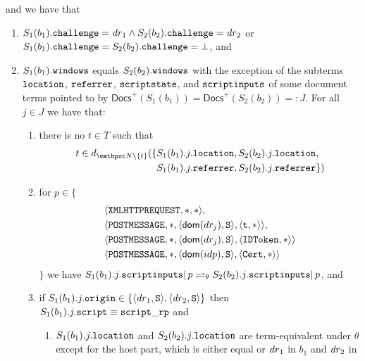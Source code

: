 \begin{theorem}
\begin{definition}
\begin{enumerate}
      and we have that
      \begin{enumerate}
      \item \label{eqs:b:challenge}
        $S_1(b_1).\mathtt{challenge} = \mathit{dr}_1 \wedge
        S_2(b_2).\mathtt{challenge} = \mathit{dr}_2$
        or $S_1(b_1).\mathtt{challenge} = S_2(b_2).\mathtt{challenge} = \bot$,
        and
      \item $S_1(b_1).\mathtt{windows}$ equals $S_2(b_2).\mathtt{windows}$ with
        the exception of the subterms $\mathtt{location}$, $\mathtt{referrer}$,
        $\mathtt{scriptstate}$, and $\mathtt{scriptinputs}$ of some document terms
        pointed to by $\mathsf{Docs}^+(S_1(b_1)) = \mathsf{Docs}^+(S_2(b_2)) =: J$. 
        For all $j \in J$ we have that: \label{eqs:b:w}
        \begin{enumerate}
        \item there is no $t \in T$ such that
          \begin{align*}
            t \in d_{\nonces \setminus \{t\}}(\{&S_1(b_1).j.\str{location}
            ,  S_2(b_2).j.\str{location},\\ & S_1(b_1).j.\str{referrer} , 
            S_2(b_2).j.\str{referrer}\})
          \end{align*}
        \item for $p \in \{$
          \begin{align*}
            & \langle\mathtt{XMLHTTPREQUEST},*,*\rangle,\\
            & \langle\mathtt{POSTMESSAGE},*,\langle\mathsf{dom}(dr_j), \mathtt{S}\rangle,\langle\mathtt{t}, *\rangle\rangle,\\
            & \langle\mathtt{POSTMESSAGE},*,\langle\mathsf{dom}(dr_j), \mathtt{S}\rangle,\langle\mathtt{IDToken}, *\rangle\rangle\\
            & \langle\mathtt{POSTMESSAGE},*,\langle\mathsf{dom}(idp), \mathtt{S}\rangle,\langle\mathtt{Cert}, *\rangle\rangle
          \end{align*}
          $\}$ we have
          $S_1(b_1).j.\mathtt{scriptinputs} |\, p \rightleftharpoons_{\theta}
          S_2(b_2).j.\mathtt{scriptinputs} |\, p$, and
        \item\label{eqs:b:w:script_rp} if
          $S_1(b_1).j.\mathtt{origin} \in \{\langle\mathit{dr}_1, \mathtt{S}\rangle,\langle\mathit{dr}_2, \mathtt{S}\rangle\}$
          then $S_1(b_1).j.\mathtt{script} \equiv \mathtt{script\_rp}$ and \
          \begin{enumerate}
          \item $S_1(b_1).j.\mathtt{location}$ and $S_2(b_2).j.\mathtt{location}$
            are term-equivalent under $\theta$ except for the host part,
            which is either equal or $\mathit{dr}_1$ in $b_1$ and $\mathit{dr}_2$ in

\end{enumerate}
\end{enumerate}
\end{enumerate}
\end{enumerate}
\end{definition}
\end{theorem}
